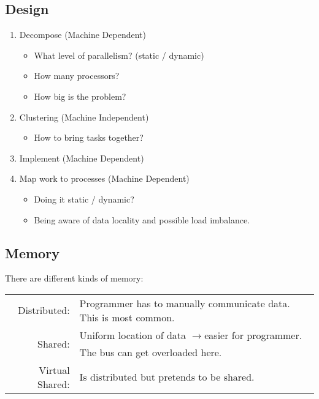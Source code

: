 \documentclass[a4paper]{article}
\newcommand{\arrow}{$\xrightarrow[]{}$}
\begin{document}
\subsection{Design}
\begin{enumerate}
\setlength{\itemsep}{0pt}
\item Decompose (Machine Dependent)
	\begin{itemize}
	\setlength{\itemsep}{-4pt}
	\item What level of parallelism? (static / dynamic)
	\item How many processors?
	\item How big is the problem?
	\end{itemize}
\item Clustering (Machine Independent)
	\begin{itemize}
	\setlength{\itemsep}{-4pt}
	\item How to bring tasks together?
	\end{itemize}
\item Implement (Machine Dependent)
\item Map work to processes (Machine Dependent)
	\begin{itemize}
	\setlength{\itemsep}{-4pt}
	\item Doing it static / dynamic?
	\item Being aware of data locality and possible load imbalance.
	\end{itemize}
\end{enumerate}

\subsection{Memory}
There are different kinds of memory:\\
\begin{tabular}{rl}
Distributed:&Programmer has to manually communicate data. This is most common.\\
Shared:&Uniform location of data \arrow easier for programmer. The bus can get overloaded here.\\
Virtual Shared:&Is distributed but pretends to be shared.
\end{tabular}
\end{document}
